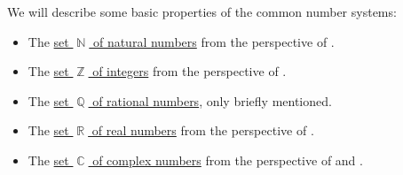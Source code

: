We will describe some basic properties of the common number systems:
\begin{itemize}
  \item The \hyperref[def:natural_numbers]{set \( \BbbN \) of natural numbers} from the perspective of .
  \item The \hyperref[def:integers]{set \( \BbbZ \) of integers} from the perspective of .
  \item The \hyperref[def:rational_numbers]{set \( \BbbQ \) of rational numbers}, only briefly mentioned.
  \item The \hyperref[def:real_numbers]{set \( \BbbR \) of real numbers} from the perspective of .
  \item The \hyperref[def:real_numbers]{set \( \BbbC \) of complex numbers} from the perspective of  and .
\end{itemize}
